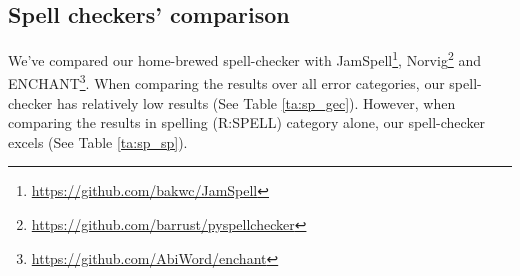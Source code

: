 \documentclass[11pt,a4paper]{article}
\begin{document}
\subsection{Spell checkers' comparison} 
\label{subsec:spell_exp}
We've compared our home-brewed spell-checker with JamSpell\footnote{\url{https://github.com/bakwc/JamSpell}}, Norvig\footnote{\url{https://github.com/barrust/pyspellchecker}} and ENCHANT\footnote{\url{https://github.com/AbiWord/enchant}}. When comparing the results over all error categories, our spell-checker has relatively low results (See Table \ref{ta:sp_gec}). However, when comparing the results in spelling (R:SPELL) category alone, our spell-checker excels (See Table \ref{ta:sp_sp}).


\begin{table}[htb]
\caption{Comparison of Grammatical Error Performance of Spellcheckers. Jamspell achieves the best score as previously suggested. \label{ta:sp_gec}}
\end{table}

\begin{table}[htb]
\caption{Comparison of spellcheckers on spelling. Our method outperforms other methods.\label{ta:sp_sp}}
\end{table}
\end{document}
